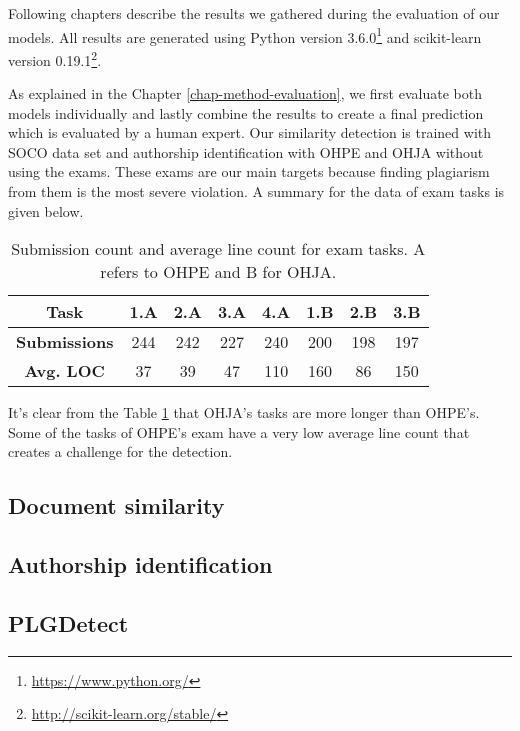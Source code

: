 
Following chapters describe the results we gathered during the evaluation of our models. All results are generated using Python version 3.6.0\footnote{\url{https://www.python.org/}} and scikit-learn version 0.19.1\footnote{\url{http://scikit-learn.org/stable/}}. 

As explained in the Chapter \ref{chap-method-evaluation}, we first evaluate both models individually and lastly combine the results to create a final prediction which is evaluated by a human expert. Our similarity detection is trained with SOCO data set and authorship identification with OHPE and OHJA without using the exams. These exams are our main targets because finding plagiarism from them is the most severe violation. A summary for the data of exam tasks is given below.

\begin{table}[ht]
\centering
\caption{Submission count and average line count for exam tasks. A refers to OHPE and B for OHJA.}
\label{tbl-exam-data}
\begin{tabular}{|c||c|c|c|c|c|c|c|}
\hline
\bf Task        & 1.A & 2.A & 3.A & 4.A & 1.B & 2.B & 3.B \\ \hline
\bf Submissions & 244 & 242 & 227 & 240 & 200 & 198 & 197 \\ \hline
\bf Avg. LOC    & 37  & 39  & 47  & 110 & 160 & 86  & 150 \\ \hline
\end{tabular}
\end{table}

\noindent
It's clear from the Table \ref{tbl-exam-data} that OHJA's tasks are more longer than OHPE's. Some of the tasks of OHPE's exam have a very low average line count that creates a challenge for the detection.

\subsection{Document similarity}


\clearpage

\subsection{Authorship identification}


\subsection{PLGDetect}



\newpage